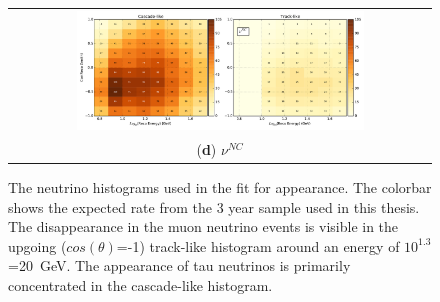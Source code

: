 \begin{figure}[h]
\begin{tabular}[b]{c}
  \includegraphics[width=0.7\textwidth]{templates/genie1x640(nc).pdf}  \\
  \small (\textbf{\color{ctcolormain}d})  $\nu^{NC}$
\end{tabular}
\caption[Neutrino histograms for appearance analysis]{The neutrino histograms used in the fit for appearance. The colorbar shows the expected rate from the 3 year sample used in this thesis. The disappearance in the muon neutrino events is visible in the upgoing ($cos(\theta)$=-1) track-like histogram around an energy of $10^{1.3}$=20~GeV. The appearance of tau neutrinos is primarily concentrated in the cascade-like histogram.}
\label{fig:nu_templates}
\end{figure}

